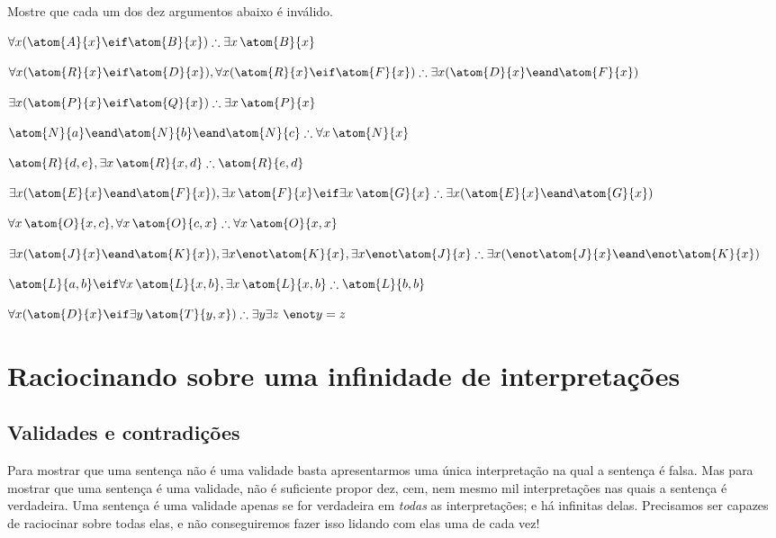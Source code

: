 \problempart
Mostre que cada um dos dez argumentos abaixo é inválido.
\begin{earg}
\item $\forall x(\atom{A}{x} \eif \atom{B}{x}) \therefore \exists x\, \atom{B}{x}$
\item $\forall x(\atom{R}{x} \eif \atom{D}{x}), \forall x(\atom{R}{x} \eif \atom{F}{x}) \therefore \exists x(\atom{D}{x} \eand \atom{F}{x})$
\item $\exists x(\atom{P}{x}\eif \atom{Q}{x}) \therefore \exists x\, \atom{P}{x}$
\item $\atom{N}{a} \eand \atom{N}{b} \eand \atom{N}{c} \therefore \forall x\, \atom{N}{x}$
\item $\atom{R}{d,e}, \exists x\, \atom{R}{x,d} \therefore \atom{R}{e,d}$
\item $\exists x(\atom{E}{x} \eand \atom{F}{x}), \exists x\, \atom{F}{x} \eif \exists x\, \atom{G}{x} \therefore \exists x(\atom{E}{x} \eand \atom{G}{x})$
\item $\forall x\, \atom{O}{x,c}, \forall x\, \atom{O}{c,x} \therefore \forall x\, \atom{O}{x,x}$
\item $\exists x(\atom{J}{x} \eand \atom{K}{x}), \exists x \enot \atom{K}{x}, \exists x \enot \atom{J}{x} \therefore \exists x(\enot \atom{J}{x} \eand \enot \atom{K}{x})$
\item $\atom{L}{a,b} \eif \forall x\, \atom{L}{x,b}, \exists x\, \atom{L}{x,b} \therefore \atom{L}{b,b}$
\item $\forall x(\atom{D}{x} \eif \exists y\, \atom{T}{y,x}) \therefore \exists y \exists z\ \enot y= z$
\end{earg}


\chapter[Infinitas interpretações]{Raciocinando sobre uma infinidade de interpretações}\label{s:InfinitInterpret}

\section{Validades e contradições}
Para mostrar que uma sentença não é uma validade basta apresentarmos uma única interpretação na qual a sentença é falsa.
Mas para mostrar que uma sentença é uma validade, não é suficiente propor dez, cem, nem mesmo mil interpretações nas quais a sentença é verdadeira.
Uma sentença é uma validade apenas se for verdadeira em \emph{todas} as interpretações; e há infinitas delas.
Precisamos ser capazes de raciocinar sobre todas elas, e não conseguiremos fazer isso lidando com elas uma de cada vez!

